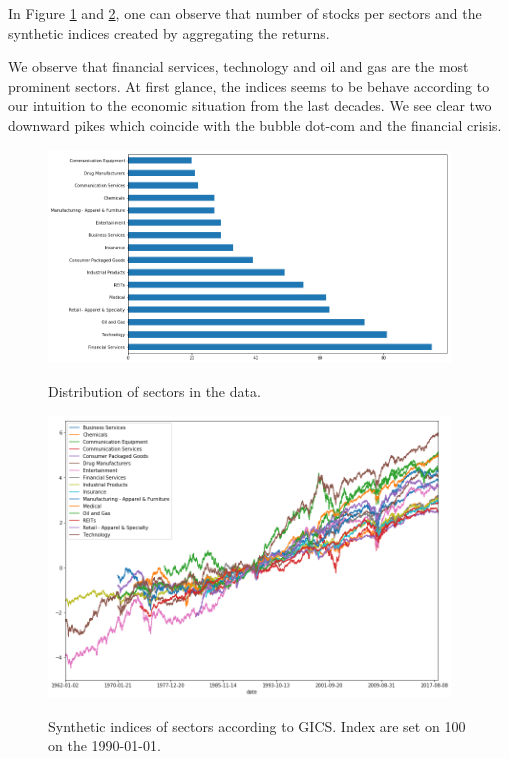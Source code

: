 \documentclass[a4paper,twoside]{article}
\begin{document}
In Figure \ref{fig:distribution-sectors} and \ref{fig:gics-level}, one can
observe that number of stocks per sectors and the synthetic indices created by
aggregating the returns.

We observe that financial services, technology and oil and gas are the most
prominent sectors. At first glance, the indices seems to be behave according to
our intuition to the economic situation from the last decades. We see clear two
downward pikes which coincide with the bubble dot-com and the financial crisis.

\begin{figure}    
\begin{center}
  \label{fig:distribution-sectors}
  \includegraphics[width=0.95\textwidth]{figures/sectors_distribution}
  \caption{Distribution of sectors in the data.}
  \end{center}
\end{figure}

\begin{figure}    
\begin{center}
  \label{fig:gics-level}
  \includegraphics[width=0.95\textwidth]{figures/indexes_level}
  \caption{Synthetic indices of sectors according to GICS. Index are set on 100 on the 1990-01-01.}
  \end{center}
\end{figure}
\end{document}
